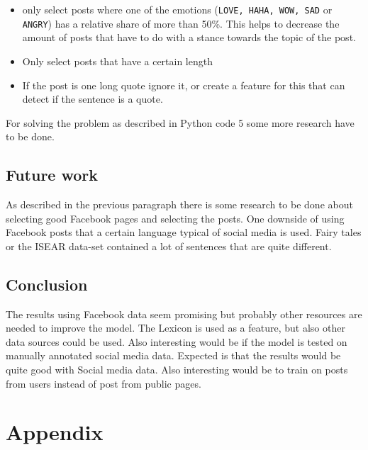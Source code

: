 \documentclass[11pt]{article}
\begin{document}
\begin{itemize}
\item only select posts where one of the emotions (\texttt{LOVE, HAHA, WOW, SAD} or \texttt{ANGRY}) has a relative share of more than 50\%. This helps to decrease the amount of posts that have to do with a stance towards the topic of the post.
\item Only select posts that have a certain length
\item If the post is one long quote ignore it, or create a feature for this that can detect if the sentence is a quote.
\end{itemize}
For solving the problem as described in Python code 5 some more research have to be done. 


\subsection{Future work}
As described in the previous paragraph there is some research to be done about selecting good Facebook pages and selecting the posts. One downside of using Facebook posts that a certain language typical of social media is used. Fairy tales or the ISEAR data-set contained a lot of sentences that are quite different.

\subsection{Conclusion}
The results using Facebook data seem promising but probably other resources are needed to improve the model. The Lexicon is used as a feature, but also other data sources could be used. Also interesting would be if the model is tested on manually annotated social media data. Expected is that the results would be quite good with Social media data. Also interesting would be to train on posts from users instead of post from public pages.

\newpage
\nocite{*}



\newpage
\section{Appendix}
\renewcommand{\thesubsection}{\Alph{subsection}}
\end{document}
